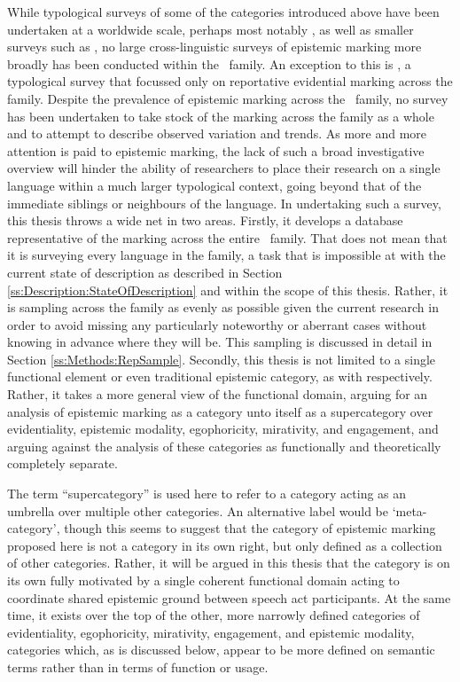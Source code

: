 While typological surveys of some of the categories introduced above have been undertaken at a worldwide scale, perhaps most notably , as well as smaller surveys such as , no large cross-linguistic surveys of epistemic marking more broadly has been conducted within the \lfam\ family. An exception to this is , a typological survey that focussed only on reportative evidential marking across the family. Despite the prevalence of epistemic marking across the \lfam\ family, no survey has been undertaken to take stock of the marking across the family as a whole and to attempt to describe observed variation and trends. As more and more attention is paid to epistemic marking, the lack of such a broad investigative overview will hinder the ability of researchers to place their research on a single language within a much larger typological context, going beyond that of the immediate siblings or neighbours of the language. In undertaking such a survey, this thesis throws a wide net in two areas. Firstly, it develops a database representative of the marking across the entire \lfam\ family. That does not mean that it is surveying every language in the family, a task that is impossible at with the current state of description as described in Section \ref{ss:Description:StateOfDescription} and within the scope of this thesis. Rather, it is sampling across the family as evenly as possible given the current research in order to avoid missing any particularly noteworthy or aberrant cases without knowing in advance where they will be. This sampling is discussed in detail in Section \ref{ss:Methods:RepSample}. Secondly, this thesis is not limited to a single functional element or even traditional epistemic category, as with  respectively. Rather, it takes a more general view of the functional domain, arguing for an analysis of epistemic marking as a category unto itself as a supercategory over evidentiality, epistemic modality, egophoricity, mirativity, and engagement, and arguing against the analysis of these categories as functionally and theoretically completely separate.

The term ``supercategory'' is used here to refer to a category acting as an umbrella over multiple other categories. An alternative label would be `meta-category', though this seems to suggest that the category of epistemic marking proposed here is not a category in its own right, but only defined as a collection of other categories. Rather, it will be argued in this thesis that the category is on its own fully motivated by a single coherent functional domain acting to coordinate shared epistemic ground between speech act participants. At the same time, it exists over the top of the other, more narrowly defined categories of evidentiality, egophoricity, mirativity, engagement, and epistemic modality, categories which, as is discussed below, appear to be more defined on semantic terms rather than in terms of function or usage.

